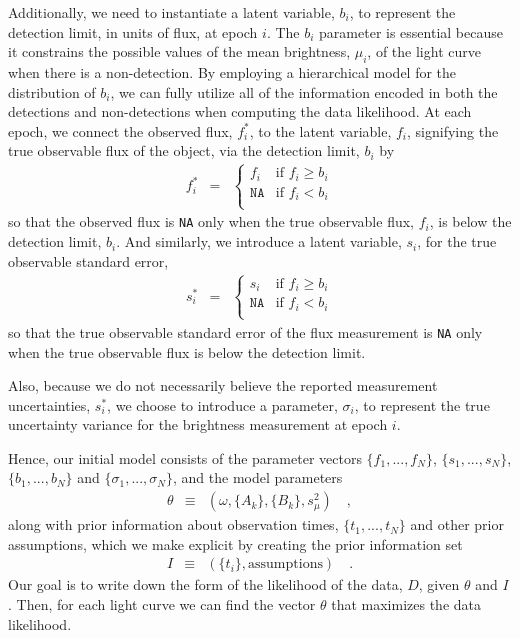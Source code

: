 \documentclass[12pt,preprint]{aastex}
\newcommand{\fobs}{f_i^*}
\newcommand{\sobs}{s_i^*}
\begin{document}
Additionally, we need to instantiate a latent variable, $b_i$, to represent the detection limit, in units of flux, at epoch $i$.  The $b_i$ parameter is essential because it constrains the possible values of the mean brightness, $\mu_i$, of the light curve when there is a non-detection.  By employing a hierarchical model for the distribution of $b_i$, we can fully utilize all of the information encoded in both the detections and non-detections when computing the data likelihood.   At each epoch, we connect the observed flux, $\fobs$, to the latent variable, $f_i$, signifying the true observable flux of the object, via the detection limit, $b_i$ by
\begin{eqnarray}\displaystyle
\fobs &=& \left\{\begin{array}{ll}
  f_i & \mbox{if $f_i \ge b_i$} \\
  \texttt{NA} & \mbox{if $f_i < b_i$} \\
\end{array} \right.
\end{eqnarray}
so that the observed flux is \texttt{NA} only when the true observable flux, $f_i$, is below the detection limit, $b_i$.  And similarly, we introduce a latent variable, $s_i$, for the true observable standard error,
\begin{eqnarray}\displaystyle
\sobs &=& \left\{\begin{array}{ll}
  s_i & \mbox{if $f_i \ge b_i$} \\
  \texttt{NA} & \mbox{if $f_i < b_i$} \\
\end{array} \right.
\end{eqnarray}
so that the true observable standard error of the flux measurement is \texttt{NA} only when the true observable flux is below the detection limit.

Also, because we do not necessarily believe the reported measurement uncertainties, $\sobs$, we choose to introduce a parameter, $\sigma_i$, to represent the true uncertainty variance for the brightness measurement at epoch $i$.

Hence, our initial model consists of the parameter vectors $\{f_1,...,f_N\}$, $\{s_1,...,s_N\}$, $\{b_1,...,b_N\}$ and $\{\sigma_1,...,\sigma_N\}$, and the model parameters
\begin{eqnarray}\displaystyle
\theta &\equiv& (\omega, \{A_k\}, \{B_k\}, s_\mu^2) \quad ,
\end{eqnarray}
along with prior information about observation times, $\{t_1,...,t_N\}$ and other prior assumptions, which we make explicit by creating the prior information set
\begin{eqnarray}\displaystyle
I &\equiv& (\{t_i\}, \mbox{assumptions}) \quad .
\end{eqnarray}
Our goal is to write down the form of the likelihood of the data, $D$, given $\theta$ and $I$.  Then, for each light curve we can find the vector $\theta$ that maximizes the data likelihood.
\end{document}
